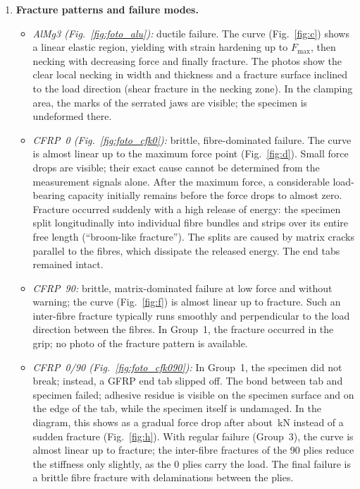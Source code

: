 \documentclass[11pt,a4paper]{article}
\newcommand{\Fmax}{F_{\mathrm{max}}}
\begin{document}
\begin{enumerate}[label=(\alph*)]
\item \textbf{Fracture patterns and failure modes.}
\begin{itemize}[nosep]
  \item \emph{AlMg3 (Fig.~\ref{fig:foto_alu}):} ductile failure. The curve
        (Fig.~\ref{fig:c}) shows a linear elastic region, yielding with strain
        hardening up to $\Fmax$, then necking with decreasing force and
        finally fracture. The photos show the clear local necking in width and
        thickness and a fracture surface inclined to the load direction
        (shear fracture in the necking zone). In the clamping area, the marks
        of the serrated jaws are visible; the specimen is undeformed there.
  \item \emph{CFRP~0\textdegree{} (Fig.~\ref{fig:foto_cfk0}):} brittle,
        fibre-dominated failure. The curve is almost linear up to the maximum
        force point (Fig.~\ref{fig:d}). Small force drops are visible; their
        exact cause cannot be determined from the measurement signals alone.
        After the maximum force, a considerable load-bearing capacity
        initially remains before the force drops to almost zero. Fracture
        occurred suddenly with a high release of energy: the specimen split
        longitudinally into individual fibre bundles and strips over its
        entire free length (``broom-like fracture''). The splits are caused by
        matrix cracks parallel to the fibres, which dissipate the released
        energy. The end tabs remained intact.
  \item \emph{CFRP~90\textdegree:} brittle, matrix-dominated failure at low
        force and without warning; the curve (Fig.~\ref{fig:f}) is almost
        linear up to fracture. Such an inter-fibre fracture typically runs
        smoothly and perpendicular to the load direction between the fibres.
        In Group~1, the fracture occurred in the grip; no photo of the
        fracture pattern is available.
  \item \emph{CFRP~0\textdegree/90\textdegree{} (Fig.~\ref{fig:foto_cfk090}):}
        In Group~1, the specimen did not break; instead, a GFRP end tab
        slipped off. The bond between tab and specimen failed; adhesive
        residue is visible on the specimen surface and on the edge of the tab,
        while the specimen itself is undamaged. In the diagram, this shows as
        a gradual force drop after about \RGeinsFmaxNullNeunzig\,kN instead of
        a sudden fracture (Fig.~\ref{fig:h}). With regular failure (Group~3),
        the curve is almost linear up to fracture; the inter-fibre fractures
        of the 90\textdegree{} plies reduce the stiffness only slightly, as the
        0\textdegree{} plies carry the load. The final failure is a brittle
        fibre fracture with delaminations between the plies.
\end{itemize}
\end{enumerate}
\end{document}
